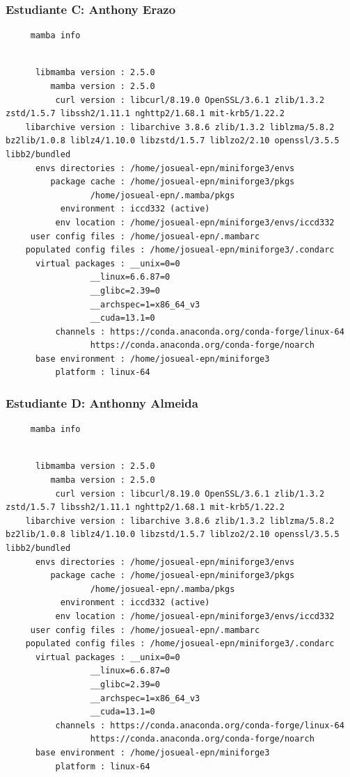 \documentclass{article}
\begin{document}
\subsubsection{Estudiante C: Anthony Erazo}
\label{sec:orgbb6b739}
\begin{verbatim}
     mamba info
\end{verbatim}

\begin{verbatim}

	  libmamba version : 2.5.0
	     mamba version : 2.5.0
	      curl version : libcurl/8.19.0 OpenSSL/3.6.1 zlib/1.3.2 zstd/1.5.7 libssh2/1.11.1 nghttp2/1.68.1 mit-krb5/1.22.2
	libarchive version : libarchive 3.8.6 zlib/1.3.2 liblzma/5.8.2 bz2lib/1.0.8 liblz4/1.10.0 libzstd/1.5.7 liblzo2/2.10 openssl/3.5.5 libb2/bundled
	  envs directories : /home/josueal-epn/miniforge3/envs
	     package cache : /home/josueal-epn/miniforge3/pkgs
			     /home/josueal-epn/.mamba/pkgs
	       environment : iccd332 (active)
	      env location : /home/josueal-epn/miniforge3/envs/iccd332
	 user config files : /home/josueal-epn/.mambarc
    populated config files : /home/josueal-epn/miniforge3/.condarc
	  virtual packages : __unix=0=0
			     __linux=6.6.87=0
			     __glibc=2.39=0
			     __archspec=1=x86_64_v3
			     __cuda=13.1=0
		  channels : https://conda.anaconda.org/conda-forge/linux-64
			     https://conda.anaconda.org/conda-forge/noarch
	  base environment : /home/josueal-epn/miniforge3
		  platform : linux-64
\end{verbatim}

\subsubsection{Estudiante D: Anthonny Almeida}
\label{sec:orgfff50ec}

\begin{verbatim}
     mamba info
\end{verbatim}

\begin{verbatim}

	  libmamba version : 2.5.0
	     mamba version : 2.5.0
	      curl version : libcurl/8.19.0 OpenSSL/3.6.1 zlib/1.3.2 zstd/1.5.7 libssh2/1.11.1 nghttp2/1.68.1 mit-krb5/1.22.2
	libarchive version : libarchive 3.8.6 zlib/1.3.2 liblzma/5.8.2 bz2lib/1.0.8 liblz4/1.10.0 libzstd/1.5.7 liblzo2/2.10 openssl/3.5.5 libb2/bundled
	  envs directories : /home/josueal-epn/miniforge3/envs
	     package cache : /home/josueal-epn/miniforge3/pkgs
			     /home/josueal-epn/.mamba/pkgs
	       environment : iccd332 (active)
	      env location : /home/josueal-epn/miniforge3/envs/iccd332
	 user config files : /home/josueal-epn/.mambarc
    populated config files : /home/josueal-epn/miniforge3/.condarc
	  virtual packages : __unix=0=0
			     __linux=6.6.87=0
			     __glibc=2.39=0
			     __archspec=1=x86_64_v3
			     __cuda=13.1=0
		  channels : https://conda.anaconda.org/conda-forge/linux-64
			     https://conda.anaconda.org/conda-forge/noarch
	  base environment : /home/josueal-epn/miniforge3
		  platform : linux-64
\end{verbatim}
\end{document}
